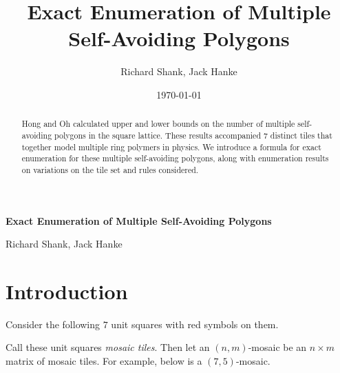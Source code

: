 \documentclass[12pt]{article}
\title{Exact Enumeration of Multiple Self-Avoiding Polygons}
\author{Richard Shank, Jack Hanke}
\date{\today}
\theoremstyle{plain}
\theoremstyle{definition}
\theoremstyle{remark}
\theoremstyle{definition}
\newcommand{\cell}[4]{ \draw[thick] ( #1 , #2 ) rectangle ( #3 , #4 );}
\newcommand{\cellA}[4]{ \draw[thick] ( #1 , #2 ) rectangle ( #3 , #4 ); \draw[red, thick] (#3 * 0.5 + #1 * 0.5 , #2) -- (#3, #4 * 0.5 + #2 * 0.5);}
\newcommand{\cellB}[4]{ \draw[thick] ( #1 , #2 ) rectangle ( #3 , #4 ); \draw[red, thick] (#3 * 0.5 + #1 * 0.5 , #2) -- (#1, #4 * 0.5 + #2 * 0.5);}
\newcommand{\cellC}[4]{ \draw[thick] ( #1 , #2 ) rectangle ( #3 , #4 ); \draw[red, thick] (#3 * 0.5 + #1 * 0.5 , #4) -- (#1, #4 * 0.5 + #2 * 0.5);}
\newcommand{\cellD}[4]{ \draw[thick] ( #1 , #2 ) rectangle ( #3 , #4 ); \draw[red, thick] (#3 * 0.5 + #1 * 0.5 , #4) -- (#3, #4 * 0.5 + #2 * 0.5);}
\newcommand{\cellE}[4]{ \draw[thick] ( #1 , #2 ) rectangle ( #3 , #4 ); \draw[red, thick] (#3 * 0.5 + #1 * 0.5 , #2) -- (#3 * 0.5 + #1 * 0.5 , #4);}
\newcommand{\cellF}[4]{ \draw[thick] ( #1 , #2 ) rectangle ( #3 , #4 ); \draw[red, thick] (#3, #4 * 0.5 + #2 * 0.5) -- (#1, #4 * 0.5 + #2 * 0.5);}
\begin{document}
\begin{center}
    \Large
    \textbf{Exact Enumeration of Multiple Self-Avoiding Polygons}
    
    \vspace{0.4cm}
    \large
    
    Richard Shank, Jack Hanke   
    \vspace{0.4cm}
    
    \vspace{0.4cm}    

    \begin{abstract}
        Hong and Oh calculated upper and lower bounds on the number of multiple self-avoiding polygons in the square lattice. These results accompanied $7$ distinct tiles that together model multiple ring polymers in physics. We introduce a formula for exact enumeration for these multiple self-avoiding polygons, along with enumeration results on variations on the tile set and rules considered.
    \end{abstract}

\end{center}

\section{Introduction}

Consider the following $7$ unit squares with red symbols on them.

\begin{center}
\end{center}

Call these unit squares \textit{mosaic tiles}. Then let an $(n,m)$-mosaic be an $n \times m$ matrix of mosaic tiles. For example, below is a $(7,5)$-mosaic.
\end{document}
